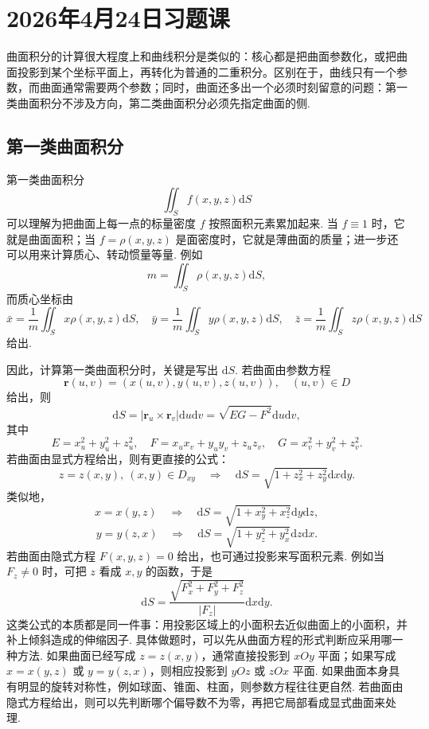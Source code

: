 \documentclass{ctexart}
\newcounter{EnvironmentCounter}
\newcommand{\renewEnvironmentCounter}{\setcounter{EnvironmentCounter}{0}}
\begin{document}
\clearpage
\renewEnvironmentCounter
\section{2026年4月24日习题课}

曲面积分的计算很大程度上和曲线积分是类似的：核心都是把曲面参数化，或把曲面投影到某个坐标平面上，再转化为普通的二重积分。区别在于，曲线只有一个参数，而曲面通常需要两个参数；同时，曲面还多出一个必须时刻留意的问题：第一类曲面积分不涉及方向，第二类曲面积分必须先指定曲面的侧.

\subsection{第一类曲面积分}

第一类曲面积分
\[
\iint_{S} f(x,y,z)\mathrm{d}S
\]
可以理解为把曲面上每一点的标量密度 $f$ 按照面积元素累加起来. 当 $f\equiv 1$ 时，它就是曲面面积；当 $f=\rho(x,y,z)$ 是面密度时，它就是薄曲面的质量；进一步还可以用来计算质心、转动惯量等量. 例如
\[
m=\iint_{S}\rho(x,y,z)\mathrm{d}S,
\]
而质心坐标由
\[
\bar{x}=\frac{1}{m}\iint_{S}x\rho(x,y,z)\mathrm{d}S,\quad
\bar{y}=\frac{1}{m}\iint_{S}y\rho(x,y,z)\mathrm{d}S,\quad
\bar{z}=\frac{1}{m}\iint_{S}z\rho(x,y,z)\mathrm{d}S
\]
给出.

因此，计算第一类曲面积分时，关键是写出 $\mathrm{d}S$. 若曲面由参数方程
\[
\boldsymbol{r}(u,v)=(x(u,v),y(u,v),z(u,v)),\quad (u,v)\in D
\]
给出，则
\[
\mathrm{d}S=\left|\boldsymbol{r}_{u}\times \boldsymbol{r}_{v}\right|\mathrm{d}u\mathrm{d}v
=\sqrt{EG-F^{2}}\mathrm{d}u\mathrm{d}v,
\]
其中
\[
E=x_{u}^{2}+y_{u}^{2}+z_{u}^{2},\quad
F=x_{u}x_{v}+y_{u}y_{v}+z_{u}z_{v},\quad
G=x_{v}^{2}+y_{v}^{2}+z_{v}^{2}.
\]
若曲面由显式方程给出，则有更直接的公式：
\[
z=z(x,y),\ (x,y)\in D_{xy}\quad\Longrightarrow\quad
\mathrm{d}S=\sqrt{1+z_{x}^{2}+z_{y}^{2}}\mathrm{d}x\mathrm{d}y.
\]
类似地，
\[
x=x(y,z)\quad\Longrightarrow\quad
\mathrm{d}S=\sqrt{1+x_{y}^{2}+x_{z}^{2}}\mathrm{d}y\mathrm{d}z,
\]
\[
y=y(z,x)\quad\Longrightarrow\quad
\mathrm{d}S=\sqrt{1+y_{z}^{2}+y_{x}^{2}}\mathrm{d}z\mathrm{d}x.
\]
若曲面由隐式方程 $F(x,y,z)=0$ 给出，也可通过投影来写面积元素. 例如当 $F_{z}\neq 0$ 时，可把 $z$ 看成 $x,y$ 的函数，于是
\[
\mathrm{d}S=\frac{\sqrt{F_{x}^{2}+F_{y}^{2}+F_{z}^{2}}}{|F_{z}|}\mathrm{d}x\mathrm{d}y.
\]
这类公式的本质都是同一件事：用投影区域上的小面积去近似曲面上的小面积，并补上倾斜造成的伸缩因子. 具体做题时，可以先从曲面方程的形式判断应采用哪一种方法. 如果曲面已经写成 $z=z(x,y)$，通常直接投影到 $xOy$ 平面；如果写成 $x=x(y,z)$ 或 $y=y(z,x)$，则相应投影到 $yOz$ 或 $zOx$ 平面. 如果曲面本身具有明显的旋转对称性，例如球面、锥面、柱面，则参数方程往往更自然. 若曲面由隐式方程给出，则可以先判断哪个偏导数不为零，再把它局部看成显式曲面来处理.
\end{document}
